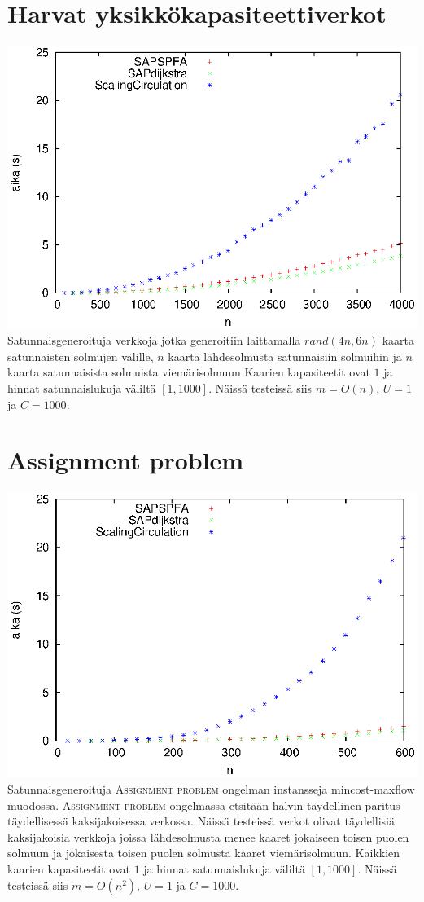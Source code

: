 \documentclass[a4paper, 11pt]{article}
\begin{document}
\section*{Harvat yksikkökapasiteettiverkot}
\includegraphics[scale=1.4]{application/random/sparseunitcap.eps}\\
Satunnaisgeneroituja verkkoja jotka generoitiin laittamalla $rand(4n, 6n)$ kaarta satunnaisten solmujen
välille, $n$ kaarta lähdesolmusta satunnaisiin solmuihin ja $n$ kaarta satunnaisista solmuista viemärisolmuun
 Kaarien kapasiteetit ovat $1$ ja hinnat satunnaislukuja
väliltä $[1, 1000]$. Näissä testeissä siis $m = O(n)$, $U = 1$ ja $C = 1000$.

\section*{Assignment problem}
\includegraphics[scale=1.4]{application/random/assignment.eps}\\
Satunnaisgeneroituja \textsc{Assignment problem} ongelman instansseja mincost-maxflow muodossa. 
\textsc{Assignment problem} ongelmassa etsitään halvin täydellinen paritus täydellisessä 
kaksijakoisessa verkossa. Näissä
testeissä verkot olivat täydellisiä kaksijakoisia verkkoja joissa lähdesolmusta menee kaaret jokaiseen
toisen puolen solmuun ja jokaisesta toisen puolen solmusta kaaret viemärisolmuun. Kaikkien kaarien kapasiteetit
ovat $1$ ja hinnat satunnaislukuja väliltä $[1, 1000]$. Näissä testeissä siis $m = O(n^2)$, $U = 1$ ja $C = 1000$.
\end{document}
